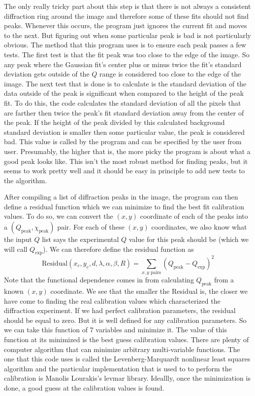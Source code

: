 The only really tricky part about this step is that
there is not always a consistent diffraction ring 
around the image and therefore some of these fits 
should not find peaks. Whenever this occurs, the program
just ignores the current fit and moves to the next. 
But figuring out when some particular peak is bad
is not particularly obvious. The method that this
program uses is to ensure each peak passes a few
tests. The first test is that the fit peak was
too close to the edge of the image. So any peak where
the Gaussian fit's center plus or minus twice the fit's
standard deviation gets outside of the $Q$ range is
considered too close to the edge of the image.
The next test that is done is to calculate is the
standard deviation of the data outside of the peak is
significant when compared to the height of the peak
fit. To do this, the code calculates the standard 
deviation of all the pixels that are farther then twice
the peak's fit standard deviation away from the
center of the peak. If the height of the peak
divided by this calculated background standard deviation
is smaller then some particular value, the peak is
considered bad. This value is called by the program
 and can be specified by the user from user.
Presumably, the higher that  is, the
more picky the program is about what a good peak looks
like. This isn't the most robust method for finding peaks,
but it seems to work pretty well and it should be easy 
in principle to add new tests to the algorithm.

After compiling a list of diffraction peaks in the image,
the program can then define a residual function which
we can minimize to find the best fit calibration values.
To do so, we can convert the $(x,y)$ coordinate
of each of the peaks into a 
$(Q_{\text{peak}},\chi_{\text{peak}})$ pair. 
For each of these $(x,y)$ coordinates, we also
know what the input $Q$ list says the experimental $Q$ 
value for this peak should be (which we will call 
$Q_{\text{exp}}$). We can therefore define
the residual function as
\begin{equation}
    \text{Residual}(x_c,y_c,d,\lambda,\alpha,\beta,R) =  
    \sum_{\text{$x,y$ pairs}} (Q_{\text{peak}} - Q_{\text{exp}})^2
\end{equation}
Note that the functional dependence comes in from
calculating $Q_{\text{peak}}$ from a known
$(x,y)$ coordinate. We see that the smaller the 
Residual is, the closer we have come to finding 
the real calibration values which characterized
the diffraction experiment. If we had perfect
calibration parameters, the residual should be
equal to zero. But it is well defined for any
calibration parameters. So we can take this 
function of 7 variables and minimize it. 
The value of this function at its minimized 
is the best guess calibration values.
There are plenty of computer algorithm that
can minimize arbitrary multi-variable functions.
The one that this code uses is called the 
Levenberg-Marquardt
nonlinear least squares algorithm
and the particular implementation that is used
to to perform the calibration is Manolis Lourakis's
levmar library\cite{lourakis04LM}. Ideallly, 
once the minimization is done, a good guess at the
calibration values is found.

